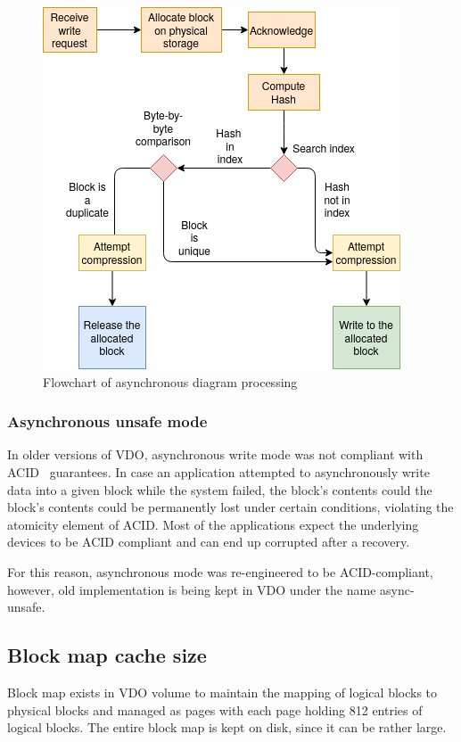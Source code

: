 \documentclass[
  color, %
  table, %
  lof,   %
  lot,   %
]{fithesis3}
\begin{document}
\begin{figure}[!htb]
        \centering
        \includegraphics[width=\textwidth]{graphics/diagrams/async.png}
\caption[Asynchronous write mode]{Flowchart of asynchronous diagram processing}
\label{fig:async}
\end{figure}

\subsubsection{Asynchronous unsafe mode}
In older versions of VDO, asynchronous write mode was not compliant with ACID~\cite{Haerder83principlesof} guarantees. In case an application attempted to asynchronously write data into a given block while the system failed, the block's contents could the block's contents could be permanently lost under certain conditions, violating the atomicity element of ACID. Most of the applications expect the underlying devices to be ACID compliant and can end up corrupted after a recovery.

For this reason, asynchronous mode was re-engineered to be ACID-compliant, however, old implementation is being kept in VDO under the name async-unsafe.~\cite{asyncunsafe}

\subsection{Block map cache size}
Block map exists in VDO volume to maintain the mapping of logical blocks to physical blocks and managed as pages with each page holding 812 entries of logical blocks. The entire block map is kept on disk, since it can be rather large.
\end{document}
